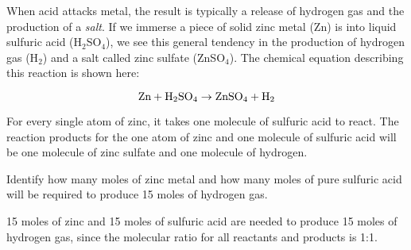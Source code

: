 

When acid attacks metal, the result is typically a release of hydrogen gas and the production of a {\it salt}.  If we immerse a piece of solid zinc metal (Zn) is into liquid sulfuric acid (H$_{2}$SO$_{4}$), we see this general tendency in the production of hydrogen gas (H$_{2}$) and a salt called zinc sulfate (ZnSO$_{4}$).  The chemical equation describing this reaction is shown here:

$$\hbox{Zn} + \hbox{H}_2\hbox{SO}_4 \to \hbox{ZnSO}_4 + \hbox{H}_2$$

For every single atom of zinc, it takes one molecule of sulfuric acid to react.  The reaction products for the one atom of zinc and one molecule of sulfuric acid will be one molecule of zinc sulfate and one molecule of hydrogen.

\vskip 10pt

Identify how many moles of zinc metal and how many moles of pure sulfuric acid will be required to produce 15 moles of hydrogen gas.







15 moles of zinc and 15 moles of sulfuric acid are needed to produce 15 moles of hydrogen gas, since the molecular ratio for all reactants and products is 1:1.











